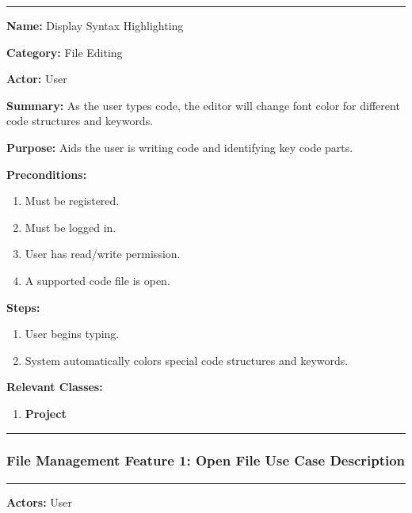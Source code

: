 \documentclass[twoside,letterpaper]{article}
\begin{document}
	\vspace{2pt}
	\hrule
	\vspace{8pt}
		\noindent\textbf{Name:} Display Syntax Highlighting \newline
		
		\noindent\textbf{Category:} File Editing \newline
		
		\noindent\textbf{Actor:} User \newline
		
		\noindent\textbf{Summary:} As the user types code, the editor will change font color for different code structures and keywords. \newline
		
		\noindent\textbf{Purpose:} Aids the user is writing code and identifying key code parts. \newline
		
		\noindent\textbf{Preconditions:}
		\begin{enumerate}
			\item Must be registered.
			\item Must be logged in.
			\item User has read/write permission.
			\item A supported code file is open.
		\end{enumerate}
		\noindent\textbf{Steps:}
		\begin{enumerate}
			\item User begins typing.
			\item System automatically colors special code structures and keywords.
		\end{enumerate}
		\noindent\textbf{Relevant Classes:}
		\begin{enumerate}
		    \item \textbf {Project}
		\end{enumerate}
	\vspace{8pt}
	\hrule
	\newpage
	
	\subsubsection[File Management Feature 1: Open File Use Case Description]{\rmfamily\bfseries\color{black}
		File Management Feature 1: Open File Use Case Description}
	\hypertarget{RefHeading22059017292}{}
	
	\vspace{2pt}
	\hrule
	\vspace{8pt}
	\textbf{Actors:} User \newline
	
\end{document}
